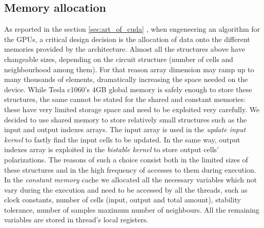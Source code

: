 \subsection{Memory allocation}
As reported in the section \ref{sec:art_of_cuda} , when engeneering an algorithm for the GPUs, a critical
design decision is the allocation of data onto the different memories provided by the architecture.
Almost all the structures above have changeable sizes, depending on the circuit structure (number of cells and neighbourhood among them).
For that reason array dimension may ramp up to many thousands of elements, dramatically increasing the space needed on the device.
While Tesla c1060's 4GB global memory is safely enough to store these structures, the same cannot be stated for the shared and constant
memories: these have very limited storage space and need to be exploited very carefully.
We decided to use shared memory to store relatively small structures such as the input and output indexes arrays. The input array is used
in the \textit{update input kernel} to fastly find the input cells to be updated. In the same way, output indexes array is exploited 
in the \textit{bistable kernel} to store output cells' polarizations.\newline
The reasons of such a choice consist both in the limited sizes of these structures and in the high frequency of accesses to them during
execution.\newline
In the \textit{constant memory} cache we allocated all the necessary variables which not vary during the execution and need to be accessed
by all the threads, such as clock constants, number of cells (input, output and total amount), stability tolerance, number of samples 
 maximum number of neighbours. All the remaining variables are stored in thread's local registers.\newline

